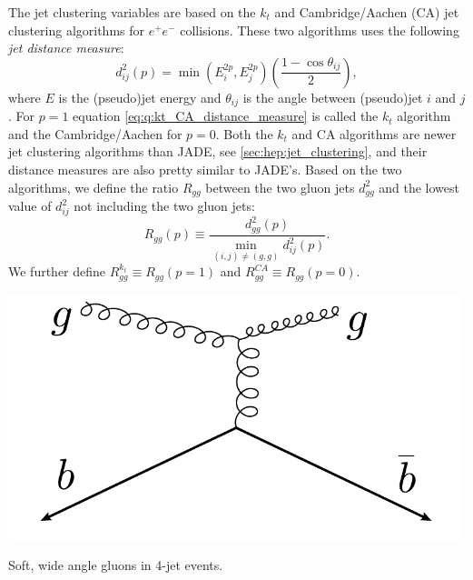The jet clustering variables are based on the $k_t$ \citep{cataniLongitudinallyinvariantKtclusteringAlgorithms1993,ellisSuccessiveCombinationJet1993} and Cambridge/Aachen (CA) \citep{dokshitzerBetterJetClustering1997,wobischHadronizationCorrectionsJet1999} jet clustering algorithms for $e^+e^-$ collisions. These two algorithms uses the following \emph{jet distance measure}:
\begin{equation}
  \label{eq:q:kt_CA_distance_measure}
  d_{ij}^2(p) = \min \left(E_i^{2p}, E_j^{2p} \right) \left(\frac{1-\cos \theta_{ij}}{2} \right), 
\end{equation}
where $E$ is the (pseudo)jet energy and $\theta_{ij}$ is the angle between (pseudo)jet $i$ and $j$ \autocite{cacciariFastJetUserManual2012}. For $p=1$ equation \eqref{eq:q:kt_CA_distance_measure} is called the $k_t$ algorithm and the Cambridge/Aachen for $p=0$. Both the $k_t$ and CA algorithms are newer jet clustering algorithms than JADE, see \autoref{sec:hep:jet_clustering}, and their distance measures are also pretty similar to JADE's. Based on the two algorithms, we define the ratio $R_{gg}$ between the two gluon jets $d^2_{gg}$ and the lowest value of $d^2_{ij}$ not including the two gluon jets:
\begin{equation}
  R_{gg}(p) \equiv \frac{d^2_{gg}(p)}{\min_{(i,j) \neq (g,g)} d^2_{ij}(p)}.
\end{equation} 
We further define $R_{gg}^{k_t} \equiv R_{gg}(p=1)$ and $R_{gg}^{CA} \equiv R_{gg}(p=0)$. 

\begin{marginfigure}[-5cm]
  \centerfloat
  \includegraphics[width=0.99\textwidth]{figures/R_kt_CA/soft_wide_angle.pdf}
  \caption[Soft Wide Angle Gluons in 4-Jet Events]
          {Soft, wide angle gluons in 4-jet events.} 
  \label{fig:q:kt_CA_soft_wide}
\end{marginfigure}

